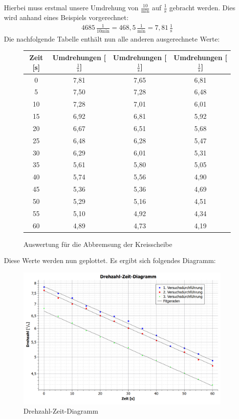 \documentclass[fontsize=12pt]{scrartcl}
\begin{document}
Hierbei muss erstmal unsere Umdrehung von $\frac{10}{\text{min}}$ auf $\frac{1}{\text{s}}$ gebracht werden. Dies wird anhand eines Beispiels vorgerechnet:
\begin{align*}
4685\,\frac{1}{10 \text{min}} = 468,5\,\frac{1}{ \text{min}} = 7,81\,\frac{1}{ \text{s}}
\end{align*}
Die nachfolgende Tabelle enthält nun alle anderen ausgerechnete Werte:
\begin{figure}[H]
\centering
\caption{Auswertung für die Abbremsung der Kreisscheibe}
\begin{tabular}{|c|c|c|c|} \hline
 Zeit [s] &  Umdrehungen [$ \frac{1}{ \text{s}}$] & Umdrehungen [$ \frac{1}{ \text{s}}$]  & Umdrehungen [$ \frac{1}{ \text{s}}$] \\ \hline
0		&7,81	&7,65	&6,81 \\ \hline
5		&7,50	&7,28	&6,48 \\ \hline
10	&7,28	&7,01	&6,01 \\ \hline
15	&6,92	&6,81	&5,92 \\ \hline
20	&6,67	&6,51	&5,68 \\ \hline
25	&6,48	&6,28	&5,47 \\ \hline
30	&6,29	&6,01	&5,31 \\ \hline
35	&5,61	&5,80	&5,05 \\ \hline
40	&5,74	&5,56	&4,90 \\ \hline
45	&5,36	&5,36	&4,69 \\ \hline
50	&5,29	&5,16	&4,51 \\ \hline
55	&5,10	&4,92	&4,34 \\ \hline
60	&4,89	&4,73	&4,19 \\ \hline
\end{tabular}				 
\end{figure}
\newpage
Diese Werte werden nun geplottet. Es ergibt sich folgendes Diagramm:
\begin{figure}[H]
\centering
\includegraphics[width=0.95\textwidth]{Graphik/Drehzahlzeit}
\caption{Drehzahl-Zeit-Diagramm}
\end{figure}
\end{document}
